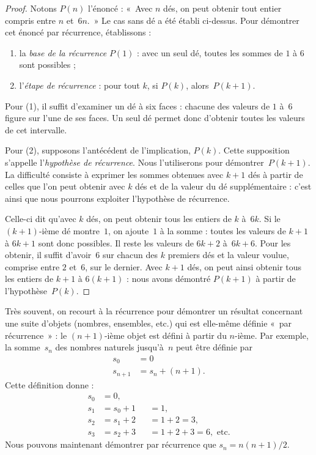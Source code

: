 \documentclass[../../../include/open-logic-section]{subfiles}
\begin{document}
\begin{proof}
Notons $P(n)$ l'énoncé :
«~Avec $n$ dés,
on peut obtenir
tout entier compris
entre $n$ et~$6n$.~»
Le cas sans dé a été établi ci-dessus.
Pour démontrer cet énoncé
par récurrence, établissons :
%
%
%
%
%
%
%
%
%
%
\begin{enumerate}
\item la \emph{base de la récurrence}
  $P(1)$ : avec un seul dé,
  toutes les sommes de
  $1$ à $6$ sont possibles ;
\item l'\emph{étape de récurrence} :
  pour tout $k$,
  si $P(k)$, alors~$P(k+1)$.
\end{enumerate}

Pour (1), il suffit d'examiner
un dé à six faces : chacune
des valeurs de $1$ à~$6$
figure sur l'une de ses faces.
Un seul dé permet donc
d'obtenir toutes les valeurs
de cet intervalle.

Pour (2), supposons
l'antécédent de l'implication,
$P(k)$. Cette supposition
s'appelle l'\emph{hypothèse
de récurrence}.
Nous l'utiliserons pour
démontrer~$P(k+1)$.
La difficulté consiste
à exprimer les sommes
obtenues avec $k+1$ dés
à partir de celles que
l'on peut obtenir avec
$k$ dés et de la valeur
du dé supplémentaire :
c'est ainsi que nous
pourrons exploiter
l'hypothèse de récurrence.

Celle-ci dit qu'avec
$k$ dés, on peut obtenir
tous les entiers de
$k$ à~$6k$. Si le
$(k+1)$-ième dé montre~$1$,
on ajoute~$1$ à la
somme : toutes les
valeurs de $k+1$
à $6k+1$ sont donc
possibles. Il reste
les valeurs de $6k+2$
à~$6k+6$. Pour les obtenir, il suffit d'avoir~$6$ sur
chacun des $k$ premiers dés et la valeur voulue,
comprise entre $2$ et~$6$, sur le dernier.
Avec $k+1$ dés,
on peut ainsi obtenir
tous les entiers de
$k+1$ à $6(k+1)$ :
nous avons démontré
$P(k+1)$ à partir
de l'hypothèse~$P(k)$.
\end{proof}

Très souvent, on recourt
à la récurrence pour
démontrer un résultat
concernant une suite
d'objets (nombres,
ensembles, etc.) qui
est elle-même définie
«~par récurrence~» :
le $(n+1)$-ième objet
est défini à partir
du $n$-ième.
Par exemple, la
somme~$s_n$ des
nombres naturels
jusqu'à~$n$ peut
être définie par
\begin{align*}
  s_0 & = 0\\
  s_{n+1} & = s_n + (n+1).
\end{align*}
Cette définition donne :
\begin{align*}
  s_0 & = 0,\\
  s_1 & = s_0 + 1 && = 1,\\
  s_2 & = s_1 + 2 && = 1 + 2 = 3,\\
  s_3 & = s_2 + 3 && = 1 + 2 + 3 = 6,
  \text{ etc.}
\end{align*}
Nous pouvons maintenant
démontrer par récurrence
que $s_n=n(n+1)/2$.
\end{document}

